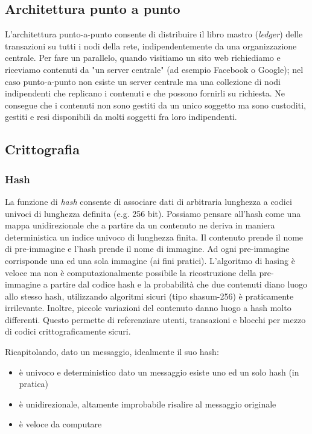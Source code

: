 \documentclass{book}
\theoremstyle{definition}
\begin{document}
\subsection{Architettura punto a punto}

L'architettura punto-a-punto consente di distribuire il libro mastro (\textit{ledger}) delle transazioni su tutti i nodi della rete,
indipendentemente da una organizzazione centrale. Per fare un parallelo, quando visitiamo un sito web richiediamo e riceviamo
contenuti da "un server centrale" (ad esempio Facebook o Google); nel caso punto-a-punto non esiste un server centrale
ma una collezione di nodi indipendenti che replicano i contenuti e che possono fornirli su richiesta.
Ne consegue che i contenuti non sono gestiti da un unico soggetto  ma sono custoditi, gestiti e resi disponibili da molti soggetti fra loro indipendenti.

\subsection{Crittografia}

\subsubsection{Hash}

La funzione di \textit{hash} consente di associare dati di arbitraria lunghezza a codici univoci di lunghezza definita (e.g. 256 bit).
Possiamo pensare all'hash come una mappa unidirezionale che a partire da un contenuto ne deriva in maniera deterministica un indice univoco di lunghezza finita.
Il contenuto prende il nome di pre-immagine e l'hash prende il nome di immagine. Ad ogni pre-immagine corrisponde una ed una sola immagine (ai fini pratici).
L'algoritmo di hasing è veloce ma non è computazionalmente possibile la ricostruzione della pre-immagine a partire dal codice hash e la probabilità che due
contenuti diano luogo allo stesso hash, utilizzando algoritmi sicuri (tipo shasum-256) è praticamente irrilevante.
Inoltre, piccole variazioni del contenuto danno luogo a hash molto differenti.
Questo permette di referenziare utenti, transazioni e blocchi per mezzo di codici crittograficamente sicuri.

Ricapitolando, dato un messaggio, idealmente il suo hash:

\begin{itemize}
    \item è univoco e deterministico dato un messaggio esiste uno ed un solo hash (in pratica)
    \item è unidirezionale, altamente improbabile risalire al messaggio originale
    \item è veloce da computare
\end{itemize}
\end{document}

